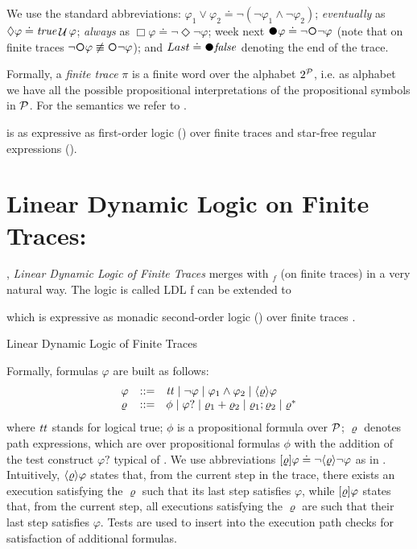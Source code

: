 We use the standard abbreviations:
$\varphi_1\lor\varphi_2 \doteq \lnot(\lnot \varphi_1\land \lnot
\varphi_2)$;
\emph{eventually} as $\Diamond\varphi \doteq \mathit{true}\mathop{\mathcal{U}}\varphi$;
\emph{always} as $\Box\varphi \doteq\lnot\Diamond\lnot\varphi$; 
week next $\Wnext\varphi \doteq \lnot\Next\lnot\varphi$ (note that on finite
traces $\lnot\Next\varphi \not\equiv \Next\lnot\varphi$); and $Last \doteq \Wnext\false$ denoting the end of the trace. 

Formally, a \emph{finite trace} $\pi$ is a finite word over the alphabet $2^{\mathcal{P}}$, i.e. as alphabet we have all the possible propositional interpretations of the propositional symbols in $\mathcal{P}$. For the semantics we refer to \citep{de2013linear}.

\LTLf is as expressive as 
first-order logic (\FO)
over finite traces
and star-free regular expressions (\REGEX).

\section{Linear Dynamic Logic on Finite Traces: \LDLf}
\LDLf, \emph{Linear Dynamic Logic of Finite Traces} merges \LTLf with \REGEX$_f$ (\REGEX on finite traces) in a very natural way.
The logic is called LDL f
\LTLf can be extended to 


 which is expressive as monadic second-order logic 
(\MSO) over finite traces \citep{de2013linear}.

Linear Dynamic Logic of Finite
Traces

Formally, \LDLf formulas $\varphi$ are built as follows:
\[\begin{array}{lcl}
\varphi &::=& {\mathit{tt}}  \mid \lnot \varphi \mid \varphi_1 \land \varphi_2 \mid \langle \varrho \rangle\varphi \\
\varrho &::=& \phi \mid \varphi? \mid  \varrho_1 + \varrho_2 \mid \varrho_1; \varrho_2 \mid \varrho^*
\end{array}
\]
where ${\mathit{tt}}$ stands for logical true; $\phi$ is a propositional
formula over $\mathcal{P}$; $\varrho$ denotes path expressions, which are \REGEX over
propositional formulas $\phi$ with the addition of the test construct
$\varphi?$ typical of \PDL.  We use abbreviations
$[\varrho]\varphi\doteq\lnot\langle \varrho \rangle{\lnot\varphi}$ as in \PDL.
Intuitively, $\langle \varrho \rangle\varphi$ states that, from the current step
in the trace, there exists an execution satisfying the \REGEX $\varrho$ 
such that its last step satisfies $\varphi$, while
$[\varrho]\varphi$ states that, from the current step, all executions
satisfying the \REGEX $\varrho$ are such that their last step
satisfies $\varphi$.
Tests are used to insert into the execution path checks for
satisfaction of additional \LDLf formulas.
%
%

